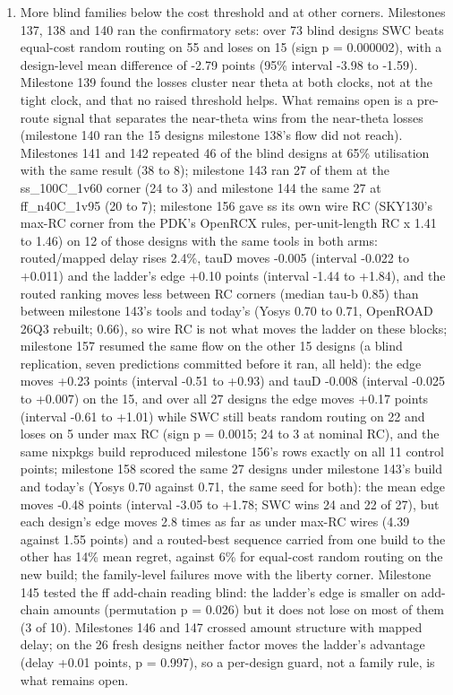 \documentclass[conference]{IEEEtran}
\providecommand{\tightlist}{\setlength{\itemsep}{0pt}\setlength{\parskip}{0pt}}
\begin{document}
\begin{enumerate}
\def\labelenumi{\arabic{enumi}.}
\setcounter{enumi}{5}
\tightlist
\item
  More blind families below the cost threshold and at other corners.
  Milestones 137, 138 and 140 ran the confirmatory sets: over 73 blind
  designs SWC beats equal-cost random routing on 55 and loses on 15
  (sign p = 0.000002), with a design-level mean difference of -2.79
  points (95\% interval -3.98 to -1.59). Milestone 139 found the losses
  cluster near theta at both clocks, not at the tight clock, and that no
  raised threshold helps. What remains open is a pre-route signal that
  separates the near-theta wins from the near-theta losses (milestone
  140 ran the 15 designs milestone 138's flow did not reach). Milestones
  141 and 142 repeated 46 of the blind designs at 65\% utilisation with
  the same result (38 to 8); milestone 143 ran 27 of them at the
  ss\_100C\_1v60 corner (24 to 3) and milestone 144 the same 27 at
  ff\_n40C\_1v95 (20 to 7); milestone 156 gave ss its own wire RC
  (SKY130's max-RC corner from the PDK's OpenRCX rules, per-unit-length
  RC x 1.41 to 1.46) on 12 of those designs with the same tools in both
  arms: routed/mapped delay rises 2.4\%, tauD moves -0.005 (interval
  -0.022 to +0.011) and the ladder's edge +0.10 points (interval -1.44
  to +1.84), and the routed ranking moves less between RC corners
  (median tau-b 0.85) than between milestone 143's tools and today's
  (Yosys 0.70 to 0.71, OpenROAD 26Q3 rebuilt; 0.66), so wire RC is not
  what moves the ladder on these blocks; milestone 157 resumed the same
  flow on the other 15 designs (a blind replication, seven predictions
  committed before it ran, all held): the edge moves +0.23 points
  (interval -0.51 to +0.93) and tauD -0.008 (interval -0.025 to +0.007)
  on the 15, and over all 27 designs the edge moves +0.17 points
  (interval -0.61 to +1.01) while SWC still beats random routing on 22
  and loses on 5 under max RC (sign p = 0.0015; 24 to 3 at nominal RC),
  and the same nixpkgs build reproduced milestone 156's rows exactly on
  all 11 control points; milestone 158 scored the same 27 designs under
  milestone 143's build and today's (Yosys 0.70 against 0.71, the same
  seed for both): the mean edge moves -0.48 points (interval -3.05 to
  +1.78; SWC wins 24 and 22 of 27), but each design's edge moves 2.8
  times as far as under max-RC wires (4.39 against 1.55 points) and a
  routed-best sequence carried from one build to the other has 14\% mean
  regret, against 6\% for equal-cost random routing on the new build;
  the family-level failures move with the liberty corner. Milestone 145
  tested the ff add-chain reading blind: the ladder's edge is smaller on
  add-chain amounts (permutation p = 0.026) but it does not lose on most
  of them (3 of 10). Milestones 146 and 147 crossed amount structure
  with mapped delay; on the 26 fresh designs neither factor moves the
  ladder's advantage (delay +0.01 points, p = 0.997), so a per-design
  guard, not a family rule, is what remains open.
\end{enumerate}
\end{document}

